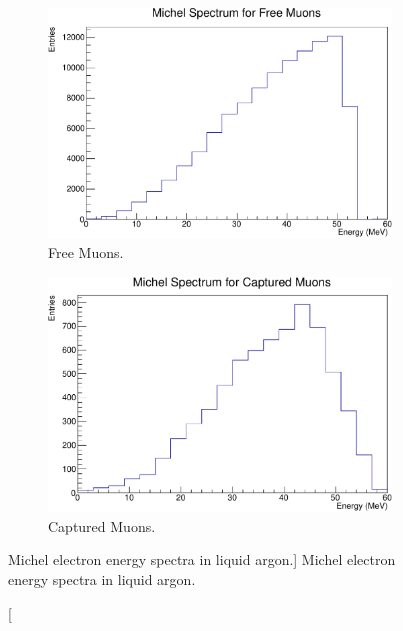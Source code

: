 \begin{figure}

	\centering
	\begin{subfigure}[b]{0.48\textwidth}
		\centering
		\includegraphics[width=\textwidth]{figures/michel_spec_free.pdf}
		\caption {Free Muons.}
		\label{fig:michel_spec_free}
	\end{subfigure}
	\hfill
	\begin{subfigure}[b]{0.48\textwidth}
		\centering
		\includegraphics[width=\textwidth]{figures/michel_spec_cap.pdf}
		\caption {Captured Muons.}
		\label{fig:michel_spec_cap}
	\end{subfigure}

	\caption
	[Michel electron energy spectra in liquid argon.]
	{Michel electron energy spectra in liquid argon.}

	\label{fig:michel_spec}

\end{figure}

